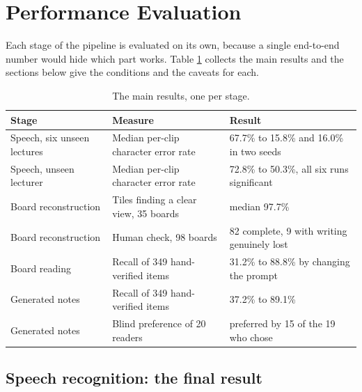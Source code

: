 
\section{Performance Evaluation}

Each stage of the pipeline is evaluated on its own, because a single end-to-end number
would hide which part works. Table \ref{tab:headline} collects the main results and the
sections below give the conditions and the caveats for each.

\begin{table}[htbp]
\centering
\caption{The main results, one per stage.}
\label{tab:headline}
\small
\begin{tabular}{p{3.8cm}p{4.4cm}p{5.0cm}}
\toprule
Stage & Measure & Result \\
\midrule
Speech, six unseen lectures & Median per-clip character error rate &
67.7\% to 15.8\% and 16.0\% in two seeds \\
\addlinespace
Speech, unseen lecturer & Median per-clip character error rate &
72.8\% to 50.3\%, all six runs significant \\
\addlinespace
Board reconstruction & Tiles finding a clear view, 35 boards & median 97.7\% \\
\addlinespace
Board reconstruction & Human check, 98 boards &
82 complete, 9 with writing genuinely lost \\
\addlinespace
Board reading & Recall of 349 hand-verified items &
31.2\% to 88.8\% by changing the prompt \\
\addlinespace
Generated notes & Recall of 349 hand-verified items & 37.2\% to 89.1\% \\
\addlinespace
Generated notes & Blind preference of 20 readers &
preferred by 15 of the 19 who chose \\
\bottomrule
\end{tabular}
\end{table}

\subsection{Speech recognition: the final result}
\label{sec:asr-result}

